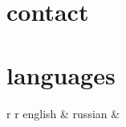 %
%
%
%
%
%








\begin{aside} %
	\section{contact}
	
	\section{languages}
	\begin{tabular}{r r}
		english & \score{4}
		russian & 
	\end{tabular}
	
\end{aside}






